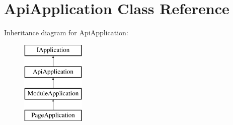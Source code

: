 \hypertarget{class_utopia_1_1_components_1_1_http_1_1_api_application}{
\section{ApiApplication Class Reference}
\label{class_utopia_1_1_components_1_1_http_1_1_api_application}
}
Inheritance diagram for ApiApplication:\begin{figure}[H]
\begin{center}
\leavevmode
\includegraphics[height=4.000000cm]{class_utopia_1_1_components_1_1_http_1_1_api_application}
\end{center}
\end{figure}
